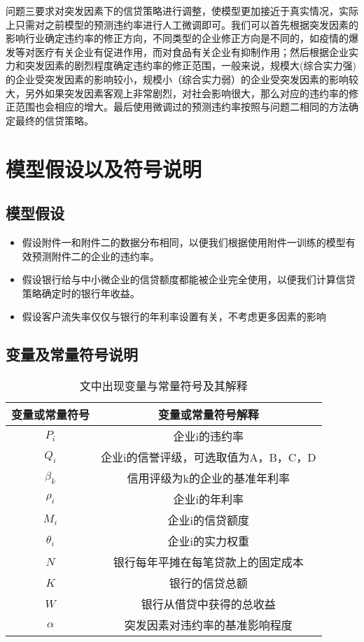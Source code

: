 \documentclass{cumcmthesis}
\begin{document}
问题三要求对突发因素下的信贷策略进行调整，使模型更加接近于真实情况，实际上只需对之前模型的预测违约率进行人工微调即可。我们可以首先根据突发因素的影响行业确定违约率的修正方向，不同类型的企业修正方向是不同的，如疫情的爆发等对医疗有关企业有促进作用，而对食品有关企业有抑制作用；然后根据企业实力和突发因素的剧烈程度确定违约率的修正范围，一般来说，规模大(综合实力强)的企业受突发因素的影响较小，规模小（综合实力弱）的企业受突发因素的影响较大，另外如果突发因素客观上非常剧烈，对社会影响很大，那么对应的违约率的修正范围也会相应的增大。最后使用微调过的预测违约率按照与问题二相同的方法确定最终的信贷策略。


\section{模型假设以及符号说明}
\subsection{模型假设}
\begin{itemize}
    \item 假设附件一和附件二的数据分布相同，以便我们根据使用附件一训练的模型有效预测附件二的企业的违约率。
    \item 假设银行给与中小微企业的信贷额度都能被企业完全使用，以便我们计算信贷策略确定时的银行年收益。
    \item 假设客户流失率仅仅与银行的年利率设置有关，不考虑更多因素的影响
\end{itemize}
\subsection{变量及常量符号说明}

\begin{table}[H] 
    
    \label{tablesymbol}
    \centering
    \begin{tabular}{c|c}   
    \hline
    变量或常量符号 & 变量或常量符号解释 \\
    \hline 
    $P_i$ & 企业i的违约率 \\
    $Q_i$ & 企业i的信誉评级，可选取值为A，B，C，D \\
    $\beta_k$ & 信用评级为k的企业的基准年利率 \\
    $\rho_i$ & 企业i的年利率    \\
    $M_i$ & 企业i的信贷额度 \\
    $\theta_i$ & 企业i的实力权重 \\
    $N$ & 银行每年平摊在每笔贷款上的固定成本 \\
    $K$ & 银行的信贷总额 \\
    $W$ & 银行从借贷中获得的总收益 \\
    $\alpha$ & 突发因素对违约率的基准影响程度 \\



    \end{tabular}
    \caption{文中出现变量与常量符号及其解释}
    \end{table}
\end{document}
